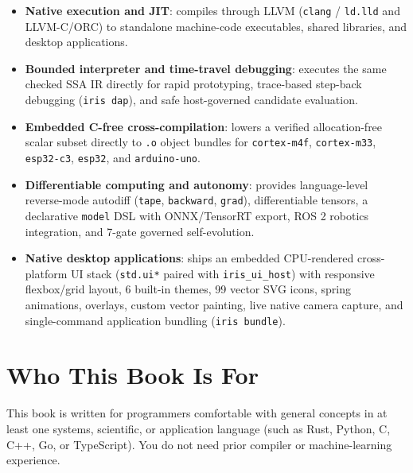 \documentclass[
  english,
  oneside]{book}
\providecommand{\tightlist}{%
  \setlength{\itemsep}{0pt}\setlength{\parskip}{0pt}}
\begin{document}
\begin{itemize}
\tightlist
\item
  \textbf{Native execution and JIT}: compiles through LLVM
  (\texttt{clang} / \texttt{ld.lld} and LLVM-C/ORC) to standalone
  machine-code executables, shared libraries, and desktop applications.
\item
  \textbf{Bounded interpreter and time-travel debugging}: executes the
  same checked SSA IR directly for rapid prototyping, trace-based
  step-back debugging (\texttt{iris\ dap}), and safe host-governed
  candidate evaluation.
\item
  \textbf{Embedded C-free cross-compilation}: lowers a verified
  allocation-free scalar subset directly to \texttt{.o} object bundles
  for \texttt{cortex-m4f}, \texttt{cortex-m33}, \texttt{esp32-c3},
  \texttt{esp32}, and \texttt{arduino-uno}.
\item
  \textbf{Differentiable computing and autonomy}: provides
  language-level reverse-mode autodiff (\texttt{tape},
  \texttt{backward}, \texttt{grad}), differentiable tensors, a
  declarative \texttt{model} DSL with ONNX/TensorRT export, ROS 2
  robotics integration, and 7-gate governed self-evolution.
\item
  \textbf{Native desktop applications}: ships an embedded CPU-rendered
  cross-platform UI stack (\texttt{std.ui*} paired with
  \texttt{iris\_ui\_host}) with responsive flexbox/grid layout, 6
  built-in themes, 99 vector SVG icons, spring animations, overlays,
  custom vector painting, live native camera capture, and single-command
  application bundling (\texttt{iris\ bundle}).
\end{itemize}

\section{Who This Book Is For}\label{who-this-book-is-for}

This book is written for programmers comfortable with general concepts
in at least one systems, scientific, or application language (such as
Rust, Python, C, C++, Go, or TypeScript). You do not need prior compiler
or machine-learning experience.
\end{document}
